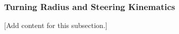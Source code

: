 
\subsubsection{Turning Radius and Steering Kinematics}
\label{subsubsec:design_2_1_3_turning_radius_steering_kinematics}

[Add content for this subsection.]
